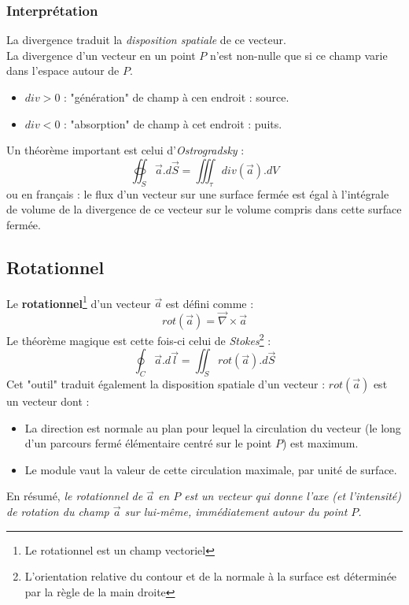 \documentclass[british,french,11pt, a4paper, openany]{book}
\begin{document}
		\subsubsection{Interprétation}
		La divergence traduit la \textit{disposition spatiale} de ce vecteur.\\
		La divergence d'un vecteur en un point $P$ n'est non-nulle que si ce champ varie dans l'espace autour de $P$.
		\begin{itemize}
			\item $div > 0$ : "génération" de champ à cen endroit : source.
			\item $div < 0$ : "absorption" de champ à cet endroit : puits.
		\end{itemize}
		Un théorème important est celui d'\textit{Ostrogradsky} :
		\begin{equation}
		\oiint_S \vec{a}.d\vec{S} = \iiint_\tau div(\vec{a}).dV
		\end{equation}
		ou en français : le flux d'un vecteur sur une surface fermée est égal à l'intégrale de volume de la divergence de ce vecteur sur le volume compris dans cette surface fermée.
		
		\subsection{Rotationnel}
		Le \textbf{rotationnel}\footnote{Le rotationnel est un champ vectoriel} d'un vecteur $\vec{a}$ est défini comme :
		\begin{equation}
		rot(\vec{a}) = \vec{\nabla} \times \vec{a}
		\end{equation}
		Le théorème magique est cette fois-ci celui de \textit{Stokes}\footnote{L'orientation relative du contour et de la normale à la surface est déterminée par la règle de la main droite} : 
		\begin{equation}
		\oint_C \vec{a}.d\vec{l} = \iint_S rot(\vec{a}).d\vec{S}
		\end{equation}
		Cet "outil" traduit également la disposition spatiale d'un vecteur : $rot(\vec{a})$ est un vecteur dont :
		\begin{itemize}
			\item La direction est normale au plan pour lequel la circulation du vecteur (le long d'un parcours fermé élémentaire centré sur le point $P$) est maximum.
			\item Le module vaut la valeur de cette circulation maximale, par unité de surface.
		\end{itemize}
		En résumé, \textit{le rotationnel de $\vec{a}$ en $P$ est un vecteur qui donne l'axe (et l'intensité) de rotation du champ $\vec{a}$ sur lui-même, immédiatement autour du point $P$.}
		
\end{document}
